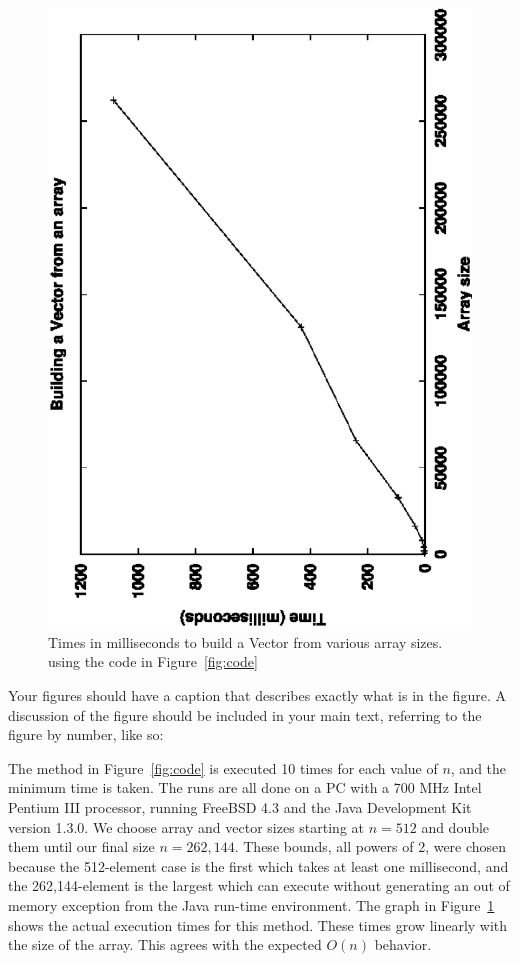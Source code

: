 \documentclass[12pt]{article}
\begin{document}
\begin{figure}[htb]
\begin{center}
\includegraphics[angle=-90,width=5in]{times.eps}
\end{center}
\caption{Times in milliseconds to build a Vector from various array
sizes. using the code in Figure~\ref{fig:code}}
\label{fig:times}
\end{figure}

Your figures should have a caption that describes exactly what is in
the figure.  A discussion of the figure should be included in your
main text, referring to the figure by number, like so:

The method in Figure~\ref{fig:code} is executed 10 times for each
value of $n$, and the minimum time is taken.  The runs are all done on
a PC with a 700 MHz Intel Pentium III processor, running FreeBSD 4.3
and the Java Development Kit version 1.3.0.  We choose array and
vector sizes starting at $n=512$ and double them until our final size
$n=262,144$.  These bounds, all powers of 2, were chosen because the
512-element case is the first which takes at least one millisecond,
and the 262,144-element is the largest which can execute without
generating an out of memory exception from the Java run-time
environment.  The graph in Figure~\ref{fig:times} shows the actual
execution times for this method.  These times grow linearly with the
size of the array.  This agrees with the expected $O(n)$ behavior.
\end{document}
